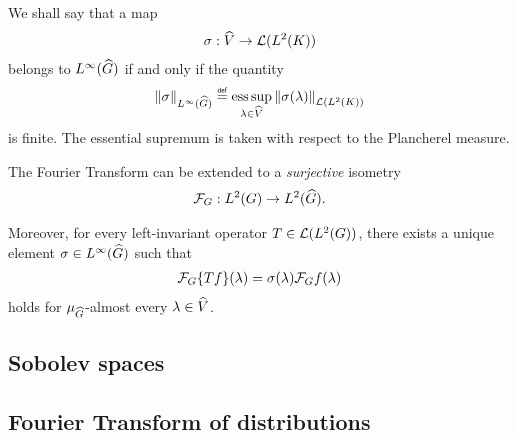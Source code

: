 \begin{definition}
    We shall say that a map
    \begin{align*}
        \sigma : {\widehat{V}} \to {\mathcal{L} ({L^{2} (K)})}
    \end{align*}
    belongs to ${L^{\infty} ({\widehat{G}})}$ if and only if the quantity
    \begin{align*}
        \norm[\LebesgueDual{\infty}{\Group}]{\sigma} \defeq
            \esssup_{\lambda \in \dualGroup{\VectorSpace}}
                \norm[\Lin{\Lebesgue{2}{\CompactGroup}}]{\sigma(\lambda)}
    \end{align*}
    is finite.
    The essential supremum is taken with respect to the Plancherel measure.
\end{definition}

\begin{theorem}
    The Fourier Transform can be extended to a \emph{surjective} isometry
    \begin{align*}
        \mathcal{F}_{G} : {L^{2} (G)} \to {L^{2} ({\widehat{G}})}.
    \end{align*}

    Moreover, for every left-invariant operator $T \in {\mathcal{L} ({L^{2} (G)})}$,
    there exists a unique element $\sigma \in {L^{\infty} ({\widehat{G}})}$ such that
    \begin{align*}
        \mathcal{F}_{G}\{T f\}(\lambda) = \sigma(\lambda) \mathcal{F}_{G} f(\lambda)
    \end{align*}
    holds for $\mu_{{\widehat{G}}}$-almost every $\lambda \in {\widehat{V}}$.
\end{theorem}

\subsection{Sobolev spaces}

\subsection{Fourier Transform of distributions}
